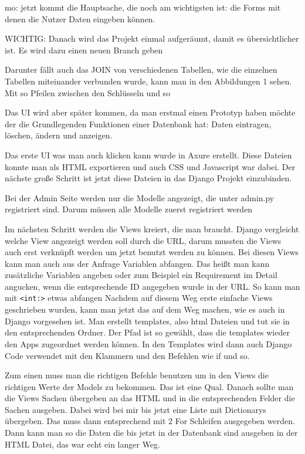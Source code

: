 \documentclass[11pt,a4paper]{report}
\begin{document}
mo: jetzt kommt die Hauptsache, die noch am wichtigsten ist: die Forms mit denen die Nutzer Daten eingeben können.

WICHTIG: Danach wird das Projekt einmal aufgeräumt, damit es übersichtlicher ist. Es wird dazu einen neuen Branch geben

Darunter fällt auch das JOIN von verschiedenen Tabellen, wie die einzelnen Tabellen miteinander verbunden wurde, kann man in den Abbildungen 1 sehen.
Mit so Pfeilen zwischen den Schlüsseln und so

Das UI wird aber später kommen, da man erstmal einen Prototyp haben möchte der die Grundlegenden Funktionen einer  Datenbank hat: Daten eintragen, löschen, ändern und anzeigen.

Das erste UI was man auch klicken kann wurde in Axure erstellt. Diese Dateien konnte man als HTML exportieren und auch CSS und Javascript war dabei. Der nächste große Schritt ist jetzt diese Dateien in das Django Projekt einzubinden. 

Bei der Admin Seite werden nur die Modelle angezeigt, die unter admin.py registriert sind. Darum müssen alle Modelle zuerst registriert werden


Im nächsten Schritt werden die Views kreiert, die man braucht. Django vergleicht welche View angezeigt werden soll durch die URL, darum mussten die Views auch erst verknüpft werden um jetzt benutzt werden zu können.
Bei diesen Views kann  man auch aus der Anfrage Variablen abfangen. Das heißt man kann zusätzliche Variablen angeben oder zum Beispiel ein Requirement im Detail angucken, wenn die entsprechende ID angegeben wurde in der URL. So kann man mit \verb|<int:>| etwas abfangen
Nachdem auf diesem Weg erste einfache Views geschrieben wurden, kann man jetzt das auf dem Weg machen, wie es auch in Django vorgesehen ist. Man erstellt templates, also html Dateien und tut sie in den entsprechenden Ordner. Der Pfad ist so gewählt, dass die templates wieder den Apps zugeordnet werden können. In den Templates wird dann auch Django Code verwendet mit den Klammern und den Befehlen wie if und so.

Zum einen muss man die richtigen Befehle benutzen um in den Views die richtigen Werte der Models zu bekommen. Das ist eine Qual. Danach sollte man die Views Sachen übergeben an das HTML und in die entsprechenden Felder die Sachen ausgeben. Dabei wird bei mir bis jetzt eine Liste mit Dictionarys übergeben. Das muss dann entsprechend mit 2 For Schleifen ausgegeben werden. Dann kann man so die Daten die bis jetzt in der Datenbank sind ausgeben in der HTML Datei, das war echt ein langer Weg. 
\end{document}
